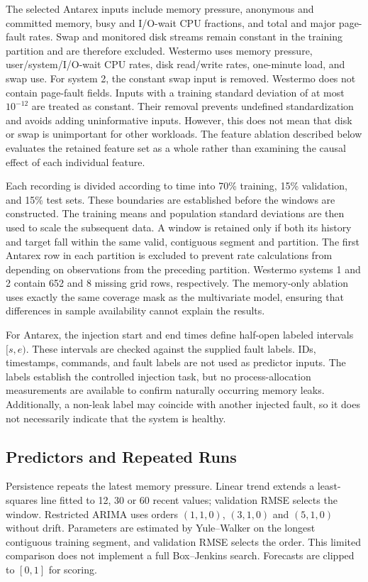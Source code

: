 \documentclass{llncs}
\begin{document}
The selected Antarex inputs include memory pressure, anonymous and committed memory, busy and I/O-wait CPU fractions, and total and major page-fault rates. Swap and monitored disk streams remain constant in the training partition and are therefore excluded. Westermo uses memory pressure, user/system/I/O-wait CPU rates, disk read/write rates, one-minute load, and swap use. For system 2, the constant swap input is removed. Westermo does not contain page-fault fields. Inputs with a training standard deviation of at most $10^{-12}$ are treated as constant. Their removal prevents undefined standardization and avoids adding uninformative inputs. However, this does not mean that disk or swap is unimportant for other workloads. The feature ablation described below evaluates the retained feature set as a whole rather than examining the causal effect of each individual feature.

Each recording is divided according to time into 70\% training, 15\% validation, and 15\% test sets. These boundaries are established before the windows are constructed. The training means and population standard deviations are then used to scale the subsequent data. A window is retained only if both its history and target fall within the same valid, contiguous segment and partition. The first Antarex row in each partition is excluded to prevent rate calculations from depending on observations from the preceding partition. Westermo systems 1 and 2 contain 652 and 8 missing grid rows, respectively. The memory-only ablation uses exactly the same coverage mask as the multivariate model, ensuring that differences in sample availability cannot explain the results.

For Antarex, the injection start and end times define half-open labeled intervals $[s,e)$. These intervals are checked against the supplied fault labels. IDs, timestamps, commands, and fault labels are not used as predictor inputs. The labels establish the controlled injection task, but no process-allocation measurements are available to confirm naturally occurring memory leaks. Additionally, a non-leak label may coincide with another injected fault, so it does not necessarily indicate that the system is healthy.

\subsection{Predictors and Repeated Runs}
Persistence repeats the latest memory pressure. Linear trend extends a least-squares line fitted to 12, 30 or 60 recent values; validation RMSE selects the window. Restricted ARIMA uses orders $(1,1,0)$, $(3,1,0)$ and $(5,1,0)$ without drift. Parameters are estimated by Yule--Walker on the longest contiguous training segment, and validation RMSE selects the order. This limited comparison does not implement a full Box--Jenkins search. Forecasts are clipped to $[0,1]$ for scoring.
\end{document}
